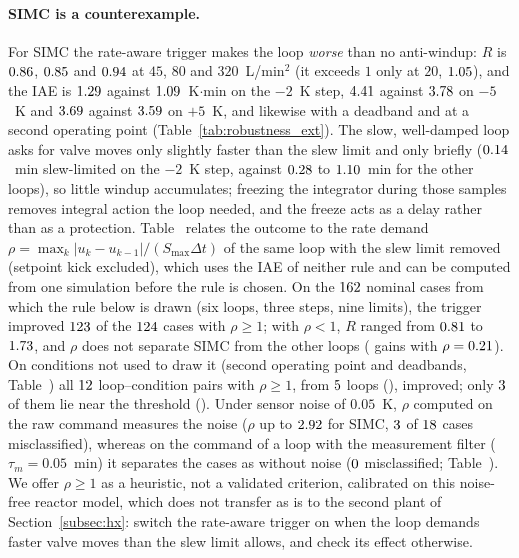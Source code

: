 \paragraph{SIMC is a counterexample.} For SIMC the rate-aware trigger makes the loop \emph{worse} than no anti-windup: $R$ is $0.86$, $0.85$ and $0.94$ at $45$, $80$ and $320$~L/min$^2$ (it exceeds $1$ only at $20$, $1.05$), and the IAE is $1.29$ against $1.09$~K$\cdot$min on the $-2$~K step, $4.41$ against $3.78$ on $-5$~K and $3.69$ against $3.59$ on $+5$~K, and likewise with a deadband and at a second operating point (Table~\ref{tab:robustness_ext}). The slow, well-damped loop asks for valve moves only slightly faster than the slew limit and only briefly ($0.14$~min slew-limited on the $-2$~K step, against $0.28$ to $1.10$~min for the other loops), so little windup accumulates; freezing the integrator during those samples removes integral action the loop needed, and the freeze acts as a delay rather than as a protection. Table~ relates the outcome to the rate demand $\rho = \max_k|u_k - u_{k-1}|/(S_{\max}\Delta t)$ of the same loop with the slew limit removed (setpoint kick excluded), which uses the IAE of neither rule and can be computed from one simulation before the rule is chosen. On the $162$ nominal cases from which the rule below is drawn (six loops, three steps, nine limits), the trigger improved $123$ of the $124$ cases with $\rho \ge 1$; with $\rho < 1$, $R$ ranged from $0.81$ to $1.73$, and $\rho$ does not separate SIMC from the other loops (\vrhohelplowloop{} gains with $\rho = 0.21$). On conditions not used to draw it (second operating point and deadbands, Table~) all $12$ loop--condition pairs with $\rho \ge 1$, from $5$ loops (\vchkhilooplist{}), improved; only $3$ of them lie near the threshold (\vchknearlist{}). Under sensor noise of $0.05$~K, $\rho$ computed on the raw command measures the noise ($\rho$ up to $2.92$ for SIMC, $3$ of $18$ cases misclassified), whereas on the command of a loop with the measurement filter ($\tau_m = 0.05$~min) it separates the cases as without noise ($0$ misclassified; Table~). We offer $\rho \ge 1$ as a heuristic, not a validated criterion, calibrated on this noise-free reactor model, which does not transfer as is to the second plant of Section~\ref{subsec:hx}: switch the rate-aware trigger on when the loop demands faster valve moves than the slew limit allows, and check its effect otherwise.




